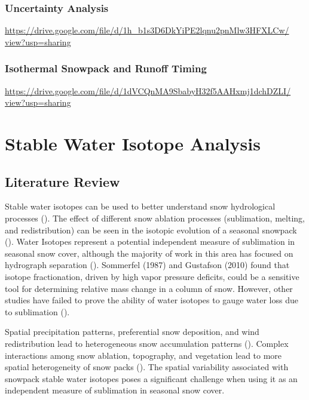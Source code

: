 \subsection{Uncertainty Analysis}
\href{https://drive.google.com/file/d/1h_b1s3D6DkYiPE2lqnu2pnMlw3HFXLCw/view?usp=sharing}{https://drive.google.com/file/d/1h_b1s3D6DkYiPE2lqnu2pnMlw3HFXLCw/ \\ view?usp=sharing}
\subsection{Isothermal Snowpack and Runoff Timing}
\href{https://drive.google.com/file/d/1dVCQnMA9SbabyH32f5AAHxmj1dchDZLI/view?usp=sharing}{https://drive.google.com/file/d/1dVCQnMA9SbabyH32f5AAHxmj1dchDZLI/ \\ view?usp=sharing}

\chapter{Stable Water Isotope Analysis} \newpage
\section{Literature Review} 
Stable water isotopes can be used to better understand snow hydrological processes (\cite{beria_larsen_ceperley_michelon_vennemann_schaefli_2017}). The effect of different snow ablation processes (sublimation, melting, and redistribution) can be seen in the isotopic evolution of a seasonal snowpack (\cite{beria_larsen_ceperley_michelon_vennemann_schaefli_2017}). Water Isotopes represent a potential independent measure of sublimation in seasonal snow cover, although the majority of work in this area has focused on hydrograph separation (\cite{gustafson2010estimating}). Sommerfel (1987) and Gustafson (2010) found that isotope fractionation, driven by high vapor pressure deficits, could be a sensitive tool for determining relative mass change in a column of snow. However, other studies have failed to prove the ability of water isotopes to gauge water loss due to sublimation (\cite{friedman1991isotopic}). 

Spatial precipitation patterns, preferential snow deposition, and wind redistribution lead to heterogeneous snow accumulation patterns (\cite{beria_larsen_ceperley_michelon_vennemann_schaefli_2017}). Complex interactions among snow ablation, topography, and vegetation lead to more spatial heterogeneity of snow packs (\cite{beria_larsen_ceperley_michelon_vennemann_schaefli_2017}). The spatial variability associated with snowpack stable water isotopes poses a significant challenge when using it as an independent measure of sublimation in seasonal snow cover. 

